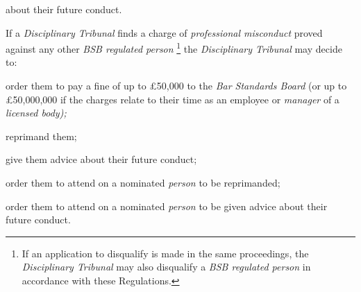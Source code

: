 about their future conduct.\ln
{}\par
If a \emph{Disciplinary Tribunal} finds a charge of \emph{professional
misconduct} proved against any other \emph{BSB regulated
person }\footnote{If an application to disqualify is made in the same proceedings,
the \emph{Disciplinary Tribunal} may also disqualify a \emph{BSB
regulated person} in accordance with these Regulations.} the \emph{Disciplinary Tribunal} may decide\emph{ }to:\\\nl \item order them to pay a fine of up to £50,000 to the \emph{Bar Standards
Board }(or up to £50,000,000 if the charges relate to their time as an
employee\emph{ }or \emph{manager }of a \emph{licensed body);}\item reprimand them;\item give them advice about their future conduct;\item order them to attend on a nominated \emph{person }to be
reprimanded;\item order them to attend on a nominated \emph{person }to be given advice
about their future conduct.\ln

